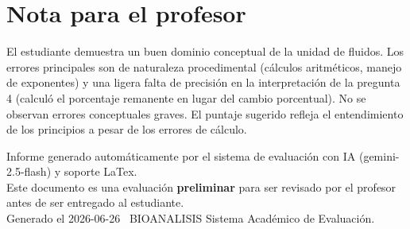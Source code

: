 \documentclass[11pt,a4paper]{article}
\begin{document}
\section*{Nota para el profesor}
\begin{tcolorbox}[
  enhanced, breakable,
  colback=yellow!8, colframe=yellow!60!black,
  fonttitle=\bfseries, coltitle=black,
  title={Observaciones para revisión manual},
  top=4pt, bottom=4pt, left=8pt, right=8pt,
]
El estudiante demuestra un buen dominio conceptual de la unidad de fluidos. Los errores principales son de naturaleza procedimental (cálculos aritméticos, manejo de exponentes) y una ligera falta de precisión en la interpretación de la pregunta 4 (calculó el porcentaje remanente en lugar del cambio porcentual). No se observan errores conceptuales graves. El puntaje sugerido refleja el entendimiento de los principios a pesar de los errores de cálculo.
\end{tcolorbox}

\vspace{12pt}
\begin{center}
  \footnotesize\color{gray}
  Informe generado automáticamente por el sistema de evaluación con IA (gemini-2.5-flash) y soporte LaTex. \\
  Este documento es una evaluación \textbf{preliminar} para ser revisado por el profesor antes de ser entregado al 
  estudiante. \\
  Generado el 2026-06-26 \textbullet\ BIOANALISIS Sistema Académico de Evaluación.
  \end{center}
\end{document}
